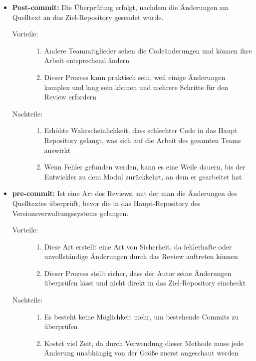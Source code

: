 \begin{description}
	\begin{itemize}	
	\item \textbf{Post-commit:}
		Die Überprüfung erfolgt, nachdem die Änderungen am Quelltext an das Ziel-Repository gesendet wurde.
		\begin{description}
			\item [Vorteile:] \hfill
			\begin{enumerate}
				\item Andere Teammitglieder sehen die Codeänderungen und können ihre Arbeit entsprechend ändern
				\item Dieser Prozess kann praktisch sein, weil einige Änderungen komplex und lang sein können und mehrere Schritte für den Review erfordern
			\end{enumerate}
			
			\item[Nachteile:] \hfill
			\begin{enumerate}
				\item Erhöhte Wahrscheinlichkeit, dass schlechter Code in das Haupt Repository gelangt, was sich auf die Arbeit des gesamten Teams auswirkt
				\item Wenn Fehler gefunden werden, kann es eine Weile dauern, bis der Entwickler zu dem Modul zurückkehrt, an dem er gearbeitet hat
			\end{enumerate}
		\end{description}
		
	\item \textbf{pre-commit:}
		Ist eine Art des Reviews, mit der man die Änderungen des Quelltextes überprüft, bevor die in das Haupt-Repository des Versionsverwaltungssystems gelangen.
		\begin{description}
		
			\item [Vorteile:] \hfill
			\begin{enumerate}
				\item Diese Art erstellt eine Art von Sicherheit, da fehlerhafte oder unvollständige Änderungen durch das Review auftreten können
				\item Dieser Prozess stellt sicher, dass der Autor seine Änderungen überprüfen lässt und nicht direkt in das Ziel-Repository eincheckt
			\end{enumerate}
		
			\item [Nachteile:] \hfill
			\begin{enumerate}
				\item Es besteht keine Möglichkeit mehr, um bestehende Commits zu überprüfen
				\item Kostet viel Zeit, da durch Verwendung dieser Methode muss jede Änderung unabhängig von der Größe zuerst angeschaut werden
			\end{enumerate}
			

\end{description}
\end{itemize}
\end{description}

